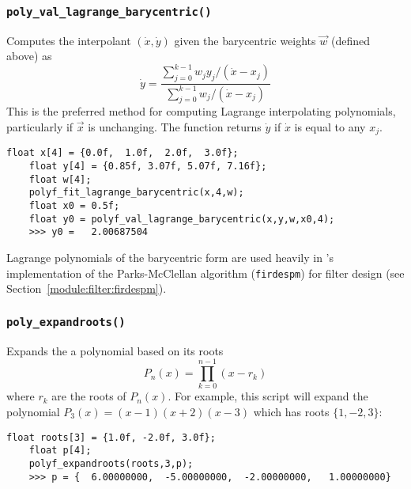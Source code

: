 \subsubsection{{\tt poly\_val\_lagrange\_barycentric()}}
\label{module:math:poly:polyf_val_lagrange_barycentric}
Computes the interpolant $(\dot{x},\dot{y})$ given the barycentric
weights $\vec{w}$ (defined above) as
%
\begin{equation}
\label{eqn:math:poly:polyval_lagrange_barycentric}
    \dot{y} =   \frac{
                    \sum\limits_{j=0}^{k-1}{ w_j y_j /(\dot{x}-x_j) }
                } {
                    \sum\limits_{j=0}^{k-1}{     w_j /(\dot{x}-x_j) }
                }
\end{equation}
%
This is the preferred method for computing Lagrange interpolating polynomials,
particularly if $\vec{x}$ is unchanging.
The function returns $\dot{y}$ if $\dot{x}$ is equal to any $x_j$.
%
\begin{Verbatim}[fontsize=\small]
    float x[4] = {0.0f,  1.0f,  2.0f,  3.0f};
    float y[4] = {0.85f, 3.07f, 5.07f, 7.16f};
    float w[4]; 
    polyf_fit_lagrange_barycentric(x,4,w);
    float x0 = 0.5f;
    float y0 = polyf_val_lagrange_barycentric(x,y,w,x0,4);
    >>> y0 =   2.00687504
\end{Verbatim}
%
Lagrange polynomials of the barycentric form are used heavily in
\liquid's implementation of the Parks-McClellan algorithm
({\tt firdespm}) for filter design
(see Section~\ref{module:filter:firdespm}).

\subsubsection{{\tt poly\_expandroots()}}
\label{module:math:poly:polyf_expandroots}
Expands the a polynomial based on its roots
%
\begin{equation}
\label{eqn:math:poly:expandroots}
    P_n(x) = \prod_{k=0}^{n-1}{(x - r_k)}
\end{equation}
%
where $r_k$ are the roots of $P_n(x)$.
For example, this script will expand the polynomial
$P_3(x) = (x-1)(x+2)(x-3)$ which has roots
$\{1,-2,3\}$:
%
\begin{Verbatim}[fontsize=\small]
    float roots[3] = {1.0f, -2.0f, 3.0f};
    float p[4];
    polyf_expandroots(roots,3,p);
    >>> p = {  6.00000000,  -5.00000000,  -2.00000000,   1.00000000}
\end{Verbatim}
%

